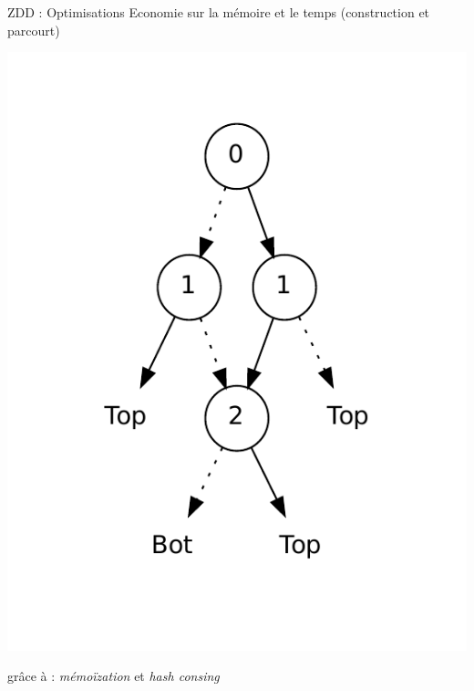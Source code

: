 \documentclass{beamer}
\begin{document}
\begin{frame}{ZDD : Optimisations}
Economie sur la mémoire et le temps (construction et parcourt)
\begin{center}
\includegraphics[scale=0.4]{../imports/zdd_construct.pdf}
\end{center}

grâce à : \emph{mémoïzation} et \emph{hash consing}

\end{frame}
\end{document}
